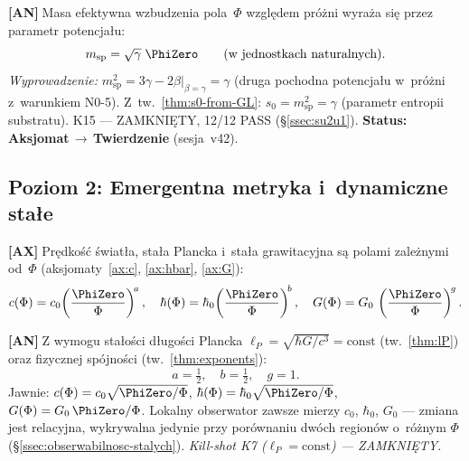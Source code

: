 \begin{chain}[A8 --- Masa substratu N0-6: $m_{\mathrm{sp}} = \sqrt{\gamma}$]%
  \label{chain:A8}
  \textbf{[AN]}$\;$Masa efektywna wzbudzenia pola~$\Phi$
  wzgl\k{e}dem pr\'o\.zni wyra\.za si\k{e} przez parametr potencja\l{}u:
  \begin{equation}\label{eq:H-msp}
    m_{\mathrm{sp}} = \sqrt{\gamma}\;\PhiZero
    \qquad (\text{w~jednostkach naturalnych}).
  \end{equation}
  \emph{Wyprowadzenie:} $m_{\mathrm{sp}}^2 = 3\gamma - 2\beta
  \big|_{\beta=\gamma} = \gamma$
  (druga pochodna potencja\l{}u w~pr\'o\.zni z~warunkiem N0-5).
  Z~tw.~\ref{thm:s0-from-GL}: $s_0 = m_{\mathrm{sp}}^2 = \gamma$
  (parametr entropii substratu).
  K15 --- ZAMKNI\k{E}TY, 12/12 PASS (\S\ref{ssec:su2u1}).
  \textbf{Status: Aksjomat\,$\to$\,Twierdzenie} (sesja~v42).
\end{chain}

\subsection{Poziom 2: Emergentna metryka i~dynamiczne sta\l{}e}%
\label{app:H-metryka}

\begin{chain}\label{chain:A9}
  \textbf{[AX]}$\;$Pr\k{e}dko\'s\'c \'swiat\l{}a, sta\l{}a Plancka
  i~sta\l{}a grawitacyjna s\k{a} polami zale\.znymi od~$\Phi$
  (aksjomaty~\ref{ax:c}, \ref{ax:hbar}, \ref{ax:G}):
  \begin{equation}\label{eq:H-stale}
    c(\Phi) = c_0\!\left(\frac{\PhiZero}{\Phi}\right)^{\!a},\quad
    \hbar(\Phi) = \hbar_0\!\left(\frac{\PhiZero}{\Phi}\right)^{\!b},\quad
    G(\Phi) = G_0\,\left(\frac{\PhiZero}{\Phi}\right)^{\!g}.
  \end{equation}
\end{chain}

\begin{chain}%
  \label{chain:A10}
  \textbf{[AN]}$\;$Z wymogu sta\l{}o\'sci d\l{}ugo\'sci Plancka
  $\ell_P = \sqrt{\hbar G / c^3} = \mathrm{const}$ (tw.~\ref{thm:lP})
  oraz fizycznej sp\'ojno\'sci (tw.~\ref{thm:exponents}):
  \begin{equation}\label{eq:H-exponents}
    a = \tfrac{1}{2},\quad b = \tfrac{1}{2},\quad g = 1.
  \end{equation}
  Jawnie: $c(\Phi) = c_0\sqrt{\PhiZero/\Phi}$,
  $\hbar(\Phi) = \hbar_0\sqrt{\PhiZero/\Phi}$,
  $G(\Phi) = G_0\,\PhiZero/\Phi$.
  Lokalny obserwator zawsze mierzy $c_0$, $\hbar_0$, $G_0$ ---
  zmiana jest relacyjna, wykrywalna jedynie przy por\'ownaniu
  dw\'och region\'ow o~r\'o\.znym $\Phi$
  (\S\ref{ssec:obserwabilnosc-stalych}).
  \emph{Kill-shot K7 ($\ell_P = \mathrm{const}$) --- ZAMKNI\k{E}TY.}
\end{chain}

